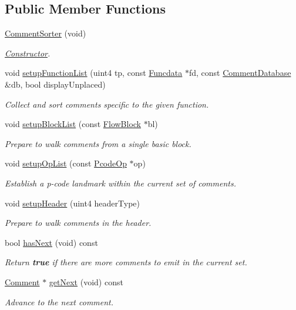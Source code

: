 \subsection*{Public Member Functions}
\begin{DoxyCompactItemize}
\item 
\mbox{\hyperlink{class_comment_sorter_a095e90b97c4d14311b48c485e968ddd1}{Comment\+Sorter}} (void)
\begin{DoxyCompactList}\small\item\em \mbox{\hyperlink{class_constructor}{Constructor}}. \end{DoxyCompactList}\item 
void \mbox{\hyperlink{class_comment_sorter_a9a79bd6eaeaa2dc69a3cb8246097343a}{setup\+Function\+List}} (uint4 tp, const \mbox{\hyperlink{class_funcdata}{Funcdata}} $\ast$fd, const \mbox{\hyperlink{class_comment_database}{Comment\+Database}} \&db, bool display\+Unplaced)
\begin{DoxyCompactList}\small\item\em Collect and sort comments specific to the given function. \end{DoxyCompactList}\item 
void \mbox{\hyperlink{class_comment_sorter_ac16fb35aebd4c38915061a3d68313d9e}{setup\+Block\+List}} (const \mbox{\hyperlink{class_flow_block}{Flow\+Block}} $\ast$bl)
\begin{DoxyCompactList}\small\item\em Prepare to walk comments from a single basic block. \end{DoxyCompactList}\item 
void \mbox{\hyperlink{class_comment_sorter_a37347c22d077831fef08a87ce951c2a2}{setup\+Op\+List}} (const \mbox{\hyperlink{class_pcode_op}{Pcode\+Op}} $\ast$op)
\begin{DoxyCompactList}\small\item\em Establish a p-\/code landmark within the current set of comments. \end{DoxyCompactList}\item 
void \mbox{\hyperlink{class_comment_sorter_a524cd5b7f4b5a6abb3aa63582b6f09c6}{setup\+Header}} (uint4 header\+Type)
\begin{DoxyCompactList}\small\item\em Prepare to walk comments in the header. \end{DoxyCompactList}\item 
bool \mbox{\hyperlink{class_comment_sorter_ab34833183c89acdcf7a132d13705dba9}{has\+Next}} (void) const
\begin{DoxyCompactList}\small\item\em Return {\bfseries{true}} if there are more comments to emit in the current set. \end{DoxyCompactList}\item 
\mbox{\hyperlink{class_comment}{Comment}} $\ast$ \mbox{\hyperlink{class_comment_sorter_ad9ce1258fc843f1ddf0db5383073401a}{get\+Next}} (void) const
\begin{DoxyCompactList}\small\item\em Advance to the next comment. \end{DoxyCompactList}\end{DoxyCompactItemize}


